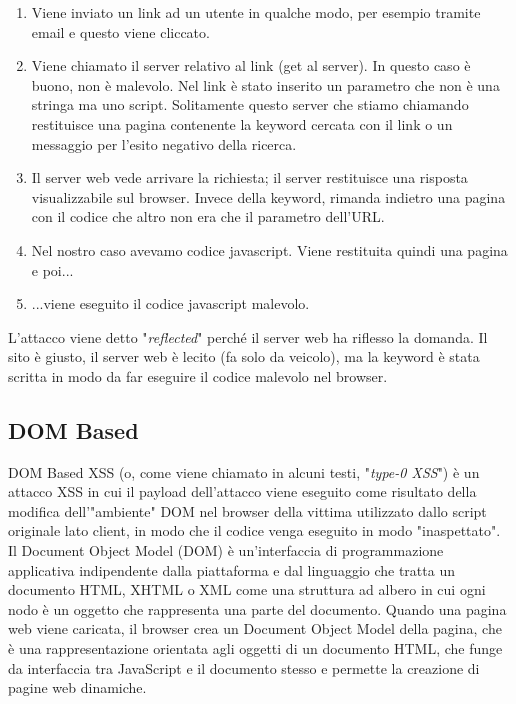 \begin{enumerate}
      \item Viene inviato un link ad un utente in qualche modo, per esempio
            tramite email e
            questo viene cliccato.
      \item Viene chiamato il server relativo al link (get al server).
            In questo caso è buono, non è
            malevolo. Nel link è stato inserito un parametro che non è una stringa
            ma uno script.
            Solitamente questo server che stiamo chiamando restituisce una
            pagina contenente la keyword
            cercata con il link
            o un messaggio per l'esito negativo della ricerca.
      \item Il server web vede arrivare la richiesta; il server restituisce una
            risposta visualizzabile
            sul browser. Invece della keyword, rimanda indietro una pagina con il codice
            che
            altro non era che il parametro dell'URL.
      \item Nel nostro caso avevamo codice javascript.
            Viene restituita quindi una pagina e poi...
      \item ...viene eseguito il codice javascript malevolo.
\end{enumerate}

L'attacco viene detto "\textit{reflected}" perché il server web ha riflesso la
domanda. Il sito è giusto,
il server web è lecito (fa solo da veicolo), ma la keyword è stata scritta in
modo da far eseguire il codice malevolo nel browser.

\subsection{DOM Based}

DOM Based XSS (o, come viene chiamato in alcuni testi, "\textit{type-0 XSS}") è
un attacco XSS in
cui il payload dell'attacco viene eseguito come risultato della modifica
dell'"ambiente" DOM
nel browser della vittima utilizzato dallo script originale lato client,
in modo che il codice
venga eseguito in modo "inaspettato".
Il Document Object Model (DOM) è un'interfaccia di programmazione applicativa
indipendente dalla piattaforma e dal linguaggio che tratta un documento HTML,
XHTML o XML
come una struttura ad albero in cui ogni nodo è un oggetto che rappresenta una
parte del documento.
Quando una pagina web viene caricata, il browser crea un Document Object Model
della pagina, che è una rappresentazione orientata agli oggetti di un documento
HTML, che funge
da interfaccia tra JavaScript e il documento stesso e permette la creazione di
pagine web dinamiche.

